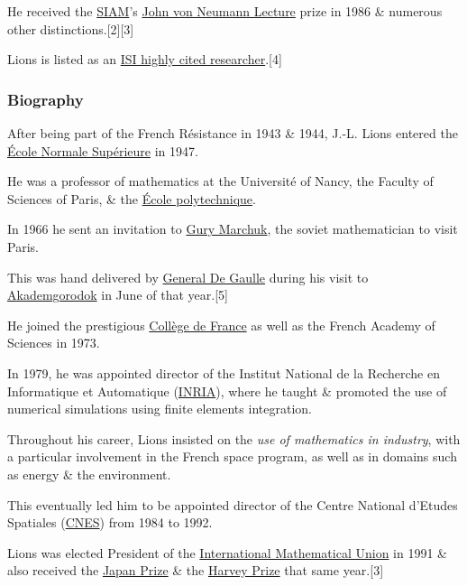 \documentclass{article}
\begin{document}
He received the \href{https://en.wikipedia.org/wiki/Society_for_Industrial_and_Applied_Mathematics}{SIAM}'s \href{https://en.wikipedia.org/wiki/John_von_Neumann_Lecture}{John von Neumann Lecture} prize in 1986 \& numerous other distinctions.[2][3]

Lions is listed as an \href{https://en.wikipedia.org/wiki/ISI_highly_cited_researcher}{ISI highly cited researcher}.[4] 

\subsubsection{Biography}
After being part of the French Résistance in 1943 \& 1944, J.-L. Lions entered the \href{https://en.wikipedia.org/wiki/%C3%89cole_Normale_Sup%C3%A9rieure}{École Normale Supérieure} in 1947.

He was a professor of mathematics at the Université of Nancy, the Faculty of Sciences of Paris, \& the \href{https://en.wikipedia.org/wiki/%C3%89cole_polytechnique}{École polytechnique}.

%
In 1966 he sent an invitation to \href{https://en.wikipedia.org/wiki/Gury_Marchuk}{Gury Marchuk}, the soviet mathematician to visit Paris.

This was hand delivered by \href{https://en.wikipedia.org/wiki/General_De_Gaulle}{General De Gaulle} during his visit to \href{https://en.wikipedia.org/wiki/Akademgorodok}{Akademgorodok} in June of that year.[5]

%
He joined the prestigious \href{https://en.wikipedia.org/wiki/Coll%C3%A8ge_de_France}{Collège de France} as well as the French Academy of Sciences in 1973.

In 1979, he was appointed director of the Institut National de la Recherche en Informatique et Automatique (\href{https://en.wikipedia.org/wiki/INRIA}{INRIA}), where he taught \& promoted the use of numerical simulations using finite elements integration.

Throughout his career, Lions insisted on the \textit{use of mathematics in industry}, with a particular involvement in the French space program, as well as in domains such as energy \& the environment.

This eventually led him to be appointed director of the Centre National d'Etudes Spatiales (\href{https://en.wikipedia.org/wiki/CNES}{CNES}) from 1984 to 1992.

%
Lions was elected President of the \href{https://en.wikipedia.org/wiki/International_Mathematical_Union}{International Mathematical Union} in 1991 \& also received the \href{https://en.wikipedia.org/wiki/Japan_Prize}{Japan Prize} \& the \href{https://en.wikipedia.org/wiki/Harvey_Prize}{Harvey Prize} that same year.[3]
\end{document}
